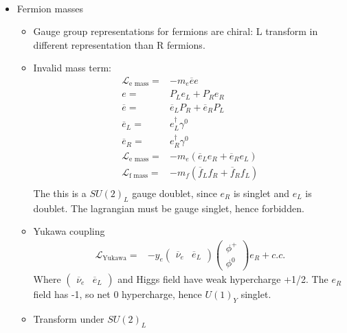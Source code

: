 \begin{itemize}
\begin{itemize}
\begin{equation}
\begin{split}
        \end{split}\end{equation}
    \end{itemize}
    \item {\color{blue} Fermion masses} \cite{wells}
    \begin{itemize}
        \item Gauge group representations for fermions are chiral: L transform in different representation than R fermions. \cite{wells}
        \item Invalid mass term: \cite{wells}
        \begin{equation}\begin{split}
        \mathcal{L}_{\text{e mass}}=&-m_e\overline{e}e \\
        e=&P_Le_L+P_Re_R \\
        \overline{e}=&\overline{e}_LP_R+\overline{e}_RP_L\\
        \overline{e}_L=&e_L^\dagger\gamma^0 \\
        \overline{e}_R=&e_R^\dagger\gamma^0 \\
        \mathcal{L}_{\text{e mass}}=&-m_e(\overline{e}_Le_R+\overline{e}_Re_L) \\
        \mathcal{L}_{\text{f mass}}=&-m_f(\overline{f}_Lf_R+\overline{f}_Rf_L) \\
        \end{split}\end{equation}
        The this is a $SU(2)_L$ gauge doublet, since $e_R$ is singlet and $e_L$ is doublet. The lagrangian must be gauge singlet, hence forbidden.
        \item Yukawa coupling \cite{wells}
        \begin{equation}\begin{split}
        \mathcal{L}_{\text{Yukawa}}=&-y_e\begin{pmatrix}\overline{\nu}_e&\overline{e}_L\end{pmatrix}\begin{pmatrix}\phi^+\\\phi^0\end{pmatrix}e_R+c.c.
        \end{split}\end{equation}
        Where $\begin{pmatrix}\overline{\nu}_e&\overline{e}_L\end{pmatrix}$ and Higgs field have weak hypercharge +1/2. The $e_R$ field has -1, so net 0 hypercharge, hence $U(1)_Y$ singlet.
        \item Transform under $SU(2)_L$ \cite{wells}

\end{itemize}
\end{itemize}
